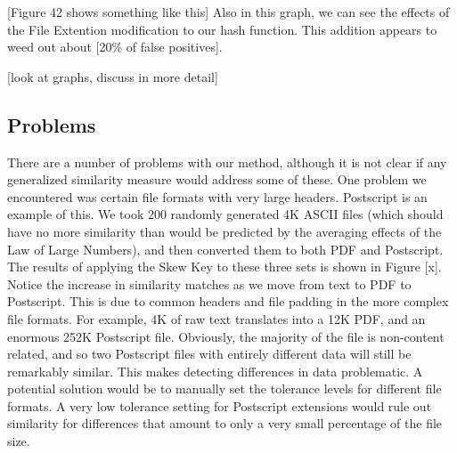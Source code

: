 \documentclass[10pt, twocolumn]{article}
\begin{document}
 [Figure 42 shows something like this]  Also in this graph, we can see the effects of the File Extention modification to our hash function.  This addition appears to weed out about [20\% of false positives].


[look at graphs, discuss in more detail]




\subsection{Problems}

There are a number of problems with our method, although it is not clear if any  generalized similarity measure would address some of these.  One problem we encountered was certain file formats with very large headers.  Postscript is an example of this.  We took 200 randomly generated 4K ASCII files (which should have no more similarity than would be predicted by the averaging effects of the Law of Large Numbers), and then converted them to both PDF and Postscript.  The results of applying the Skew Key to these three sets is shown in Figure [x].  Notice the increase in similarity matches as we move from text to PDF to Postscript.  This is due to common headers and file padding in the more complex file formats.  For example, 4K of raw text translates into a 12K PDF, and an enormous 252K Postscript file.  Obviously, the majority of the file is non-content related, and so two Postscript files with entirely different data will still be remarkably similar.  This makes detecting differences in data problematic.  A potential solution would be to manually set the tolerance levels for different file formats.  A very low tolerance setting for Postscript extensions would rule out similarity for differences that amount to only a very small percentage of the file size.
\end{document}
